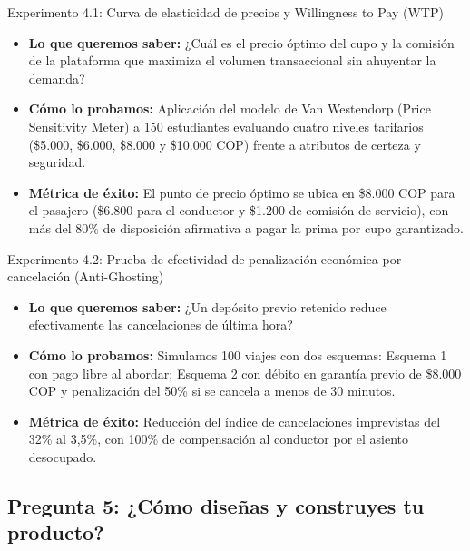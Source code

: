 \documentclass[11pt,a4paper]{article}
\begin{document}
\begin{kbibox}{Experimento 4.1: Curva de elasticidad de precios y Willingness to Pay (WTP)}
\begin{itemize}[leftmargin=*]
    \item \textbf{Lo que queremos saber:} ¿Cuál es el precio óptimo del cupo y la comisión de la plataforma que maximiza el volumen transaccional sin ahuyentar la demanda?
    \item \textbf{Cómo lo probamos:} Aplicación del modelo de Van Westendorp (Price Sensitivity Meter) a 150 estudiantes evaluando cuatro niveles tarifarios (\$5.000, \$6.000, \$8.000 y \$10.000 COP) frente a atributos de certeza y seguridad.
    \item \textbf{Métrica de éxito:} El punto de precio óptimo se ubica en \$8.000 COP para el pasajero (\$6.800 para el conductor y \$1.200 de comisión de servicio), con más del 80\% de disposición afirmativa a pagar la prima por cupo garantizado.
\end{itemize}
\end{kbibox}

\begin{kbibox}{Experimento 4.2: Prueba de efectividad de penalización económica por cancelación (Anti-Ghosting)}
\begin{itemize}[leftmargin=*]
    \item \textbf{Lo que queremos saber:} ¿Un depósito previo retenido reduce efectivamente las cancelaciones de última hora?
    \item \textbf{Cómo lo probamos:} Simulamos 100 viajes con dos esquemas: Esquema 1 con pago libre al abordar; Esquema 2 con débito en garantía previo de \$8.000 COP y penalización del 50\% si se cancela a menos de 30 minutos.
    \item \textbf{Métrica de éxito:} Reducción del índice de cancelaciones imprevistas del 32\% al 3,5\%, con 100\% de compensación al conductor por el asiento desocupado.
\end{itemize}
\end{kbibox}

\subsection{Pregunta 5: ¿Cómo diseñas y construyes tu producto?}
\end{document}
